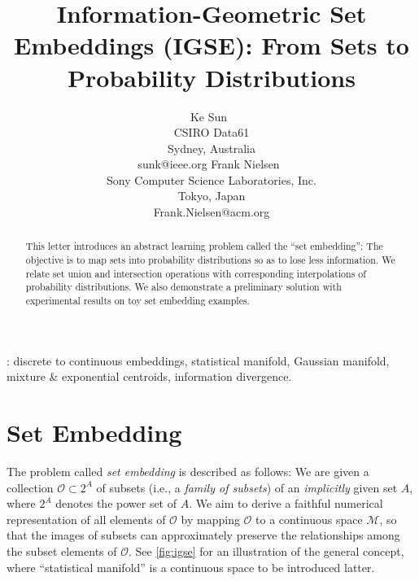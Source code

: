 \documentclass{article}
\newcommand\orcidicon[1]{\href{https://orcid.org/#1}{\mbox{\scalerel*{
\begin{tikzpicture}[yscale=-1,transform shape]
\pic{orcidlogo};
\end{tikzpicture}
}{|}}}}
\begin{document}
\title{Information-Geometric Set Embeddings (IGSE): From Sets to Probability Distributions
}

\author{Ke Sun~\orcidicon{0000-0001-6263-7355}\\CSIRO Data61\\Sydney, Australia\\sunk@ieee.org%
\And%
Frank Nielsen~\orcidicon{0000-0001-5728-0726}\\Sony Computer Science Laboratories, Inc.\\Tokyo, Japan\\Frank.Nielsen@acm.org}
\date{}
\maketitle

\begin{abstract}
This letter introduces an abstract learning problem called the ``set embedding'':
The objective is to map sets into probability distributions so as to lose less information.
We relate set union and intersection operations with corresponding interpolations of probability distributions.
We also demonstrate a preliminary solution with experimental results on toy set embedding examples.
\end{abstract}


: discrete to continuous embeddings, statistical manifold, Gaussian manifold, mixture \& exponential centroids, information divergence.


\section{Set Embedding}
The problem called {\em set embedding} is described as follows: We are given a collection
$\mathcal{O}\subset2^{A}$ of subsets (i.e., a \emph{family
of subsets}) of an {\em implicitly} given set $A$, where $2^A$ denotes the power set of $A$.
We aim to derive a faithful numerical representation of all elements of $\mathcal{O}$ by mapping
$\mathcal{O}$ to a continuous space $\mathcal{M}$, so that the images of subsets can
approximately preserve the relationships among the subset elements of $\mathcal{O}$.
See \cref{fig:igse} for an illustration of the general concept, where ``statistical manifold''
is a continuous space to be introduced latter.
\end{document}
